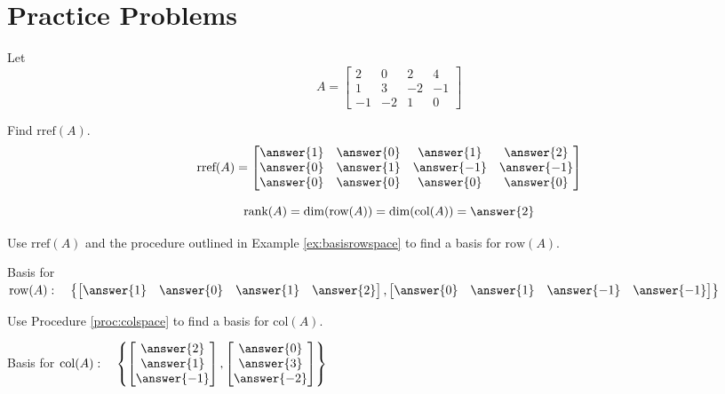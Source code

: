 \documentclass{ximera}
\begin{document}
\section*{Practice Problems}
\begin{problem}\label{prob:colrowmatrixA}
Let
$$A=\begin{bmatrix}2&0&2&4\\1&3&-2&-1\\-1&-2&1&0\end{bmatrix}$$

\begin{problem}
Find $\mbox{rref}(A)$.
$$\mbox{rref}(A)=\begin{bmatrix}\answer{1}&\answer{0}&\answer{1}&\answer{2}\\\answer{0}&\answer{1}&\answer{-1}&\answer{-1}\\\answer{0}&\answer{0}&\answer{0}&\answer{0}\end{bmatrix}$$
\end{problem}

\begin{problem}
$$\mbox{rank}(A)=\mbox{dim}(\mbox{row}(A))=\mbox{dim}(\mbox{col}(A))=\answer{2}$$
\end{problem}

\begin{problem}
Use $\mbox{rref}(A)$ and the procedure outlined in Example \ref{ex:basisrowspace} to find a basis for $\mbox{row}(A)$.

Basis for $\mbox{row}(A):\quad
\left\{\begin{bmatrix}\answer{1}& \answer{0}& \answer{1} & \answer{2}\end{bmatrix},\begin{bmatrix}\answer{0} & \answer{1}& \answer{-1} &\answer{-1}\end{bmatrix} \right\}$
\end{problem}

\begin{problem}
Use Procedure \ref{proc:colspace} to find a basis for $\mbox{col}(A)$.

Basis for $\mbox{col}(A):\quad
\left\{ \begin{bmatrix}\answer{2}\\\answer{1}\\\answer{-1}\end{bmatrix}, \begin{bmatrix}\answer{0}\\\answer{3}\\\answer{-2}\end{bmatrix}\right\}$
\end{problem}

\end{problem}
\end{document}
